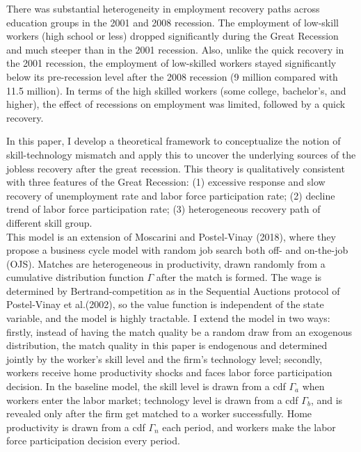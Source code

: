 \documentclass[12pt]{article}
\newcommand{\1}{\mathbb{1}}
\begin{document}
There was substantial heterogeneity in employment recovery paths across education groups in the 2001 and 2008 recession. The employment of low-skill workers (high school or less) dropped significantly during the Great Recession and much steeper than in the 2001 recession. Also, unlike the quick recovery in the 2001 recession, the employment of low-skilled workers stayed significantly below its pre-recession level after the 2008 recession (9 million compared with 11.5 million).  In terms of the high skilled workers (some college, bachelor's, and higher), the effect of recessions on employment was limited, followed by a quick recovery. 

In this paper, I develop a theoretical framework to conceptualize the notion of skill-technology mismatch and apply this to uncover the underlying sources of the jobless recovery after the great recession. This theory is qualitatively consistent with three features of the Great Recession: (1) excessive response and slow recovery of unemployment rate and labor force participation rate; (2) decline trend of labor force participation rate; (3) heterogeneous recovery path of different skill group. \\

This model is an extension of Moscarini and Postel-Vinay (2018)\cite{MPV2018}, where they propose a business cycle model with random job search both off- and on-the-job (OJS). Matches are heterogeneous in productivity, drawn randomly from a 
cumulative distribution function $\Gamma$ after the match is formed. The wage is determined by Bertrand-competition as in the Sequential Auctions protocol of Postel-Vinay et al.(2002)\cite{PostelVinayetal2002}, so the value function is independent of the state variable, and the model is highly tractable. I extend the model in two ways: firstly, instead of having the match quality be a random draw from an exogenous distribution, the match quality in this paper is endogenous and determined jointly by the worker's skill level and the firm's technology level; secondly, workers receive home productivity shocks and faces labor force participation decision. In the baseline model, the skill level is drawn from a cdf $\Gamma_a$ when workers enter the labor market; technology level is drawn from a cdf $\Gamma_b$, and is revealed only after the firm get matched to a worker successfully. Home productivity is drawn from a cdf $\Gamma_n$ each period, and workers make the labor force participation decision every period.  \\
\end{document}

